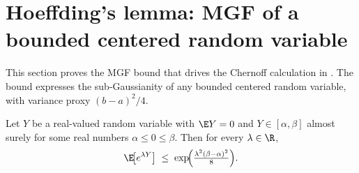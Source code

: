\section{Hoeffding's lemma: MGF of a bounded centered random variable}
\label{sec:hoeffding-lemma}

This section proves the MGF bound that drives the Chernoff calculation in
. The bound expresses the sub-Gaussianity of any bounded
centered random variable, with variance proxy $(b-a)^2/4$.

\begin{lemma}\label{lem:hoeffding-lemma}
Let $Y$ be a real-valued random variable with $\E Y = 0$ and $Y \in [\alpha, \beta]$
almost surely for some real numbers $\alpha \le 0 \le \beta$. Then for every
$\lambda \in \R$,
\begin{align}\label{eq:hoeffding-lemma}
\E\!\bigl[e^{\lambda Y}\bigr] \;\le\; \exp\!\Bigl(\tfrac{\lambda^2 (\beta - \alpha)^2}{8}\Bigr).
\end{align}
\end{lemma}

